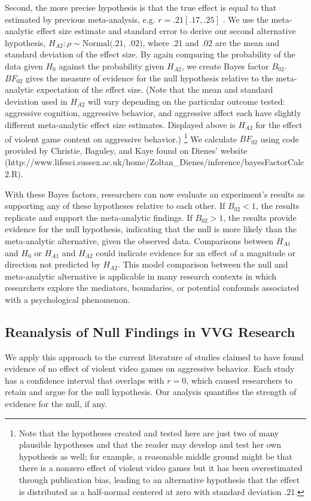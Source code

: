 \documentclass[man]{apa6}
\begin{document}
Second, the more precise hypothesis is that the true effect is equal to that estimated by previous meta-analysis, e.g. $r = .21 [.17, .25]$ \citep{Anderson:etal:2010}.  We use the meta-analytic effect size estimate and standard error to derive our second alternative hypothesis, $H_{A2}: \rho{} \sim{} \mbox{Normal(.21, .02)}$, where .21 and .02 are the mean and standard deviation of the effect size.
By again comparing the probability of the data given $H_0$ against the probability given $H_{A2}$, we create Bayes factor $B_{02}$. $BF_{02}$ gives the measure of evidence for the null hypothesis relative to the meta-analytic expectation of the effect size. (Note that the mean and standard deviation used in $H_{A2}$ will vary depending on the particular outcome tested: aggressive cognition, aggressive behavior, and aggressive affect each have slightly different meta-analytic effect size estimates. Displayed above is $H_{A2}$ for the effect of violent game content on aggressive behavior.) \footnote{Note that the hypotheses created and tested here are just two of many plausible hypotheses and that the reader may develop and test her own hypothesis as well; for example, a reasonable middle ground might be that there is a nonzero effect of violent video games but it has been overestimated through publication bias, leading to an alternative hypothesis that the effect is distributed as a half-normal centered at zero with standard deviation .21.} 
We calculate $BF_{02}$ using code provided by Christie, Baguley, and Kaye found on Dienes' website (http://www.lifesci.sussex.ac.uk/home/Zoltan_Dienes/inference/bayesFactorCalc2.R). 
%

With these Bayes factors, researchers can now evaluate an experiment's results as supporting any of these hypotheses relative to each other. If $B_{02} < 1$, the results replicate and support the meta-analytic findings. If $B_{02} > 1$, the results provide evidence for the null hypothesis, indicating that the null is more likely than the meta-analytic alternative, given the observed data.  Comparisons between $H_{A1}$ and $H_0$ or $H_{A1}$ and $H_{A2}$ could indicate evidence for an effect of a magnitude or direction not predicted by $H_{A2}$. This model comparison between the null and meta-analytic alternative is applicable in many research contexts in which researchers explore the mediators, boundaries, or potential confounds associated with a psychological phenomenon.

\subsection{Reanalysis of Null Findings in VVG Research}
We apply this approach to the current literature of studies claimed to have found evidence of no effect of violent video games on aggressive behavior. Each study has a confidence interval that overlaps with $r = 0$, which caused researchers to retain and argue for the null hypothesis. Our analysis quantifies the strength of evidence for the null, if any.
\end{document}
